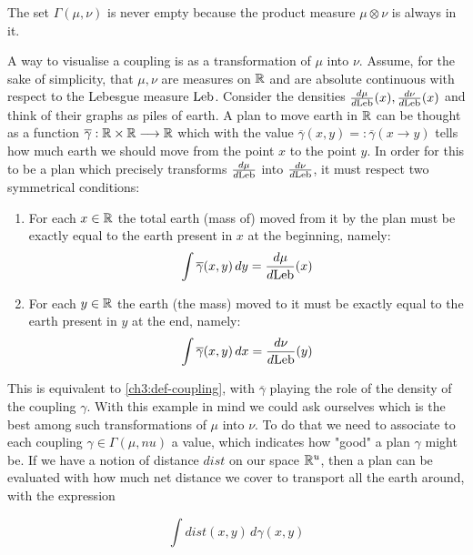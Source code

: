 \begin{remark}
	The set $\Gamma(\mu,\nu)$ is never empty because the product measure $\mu \otimes \nu$ is always in it.
\end{remark}

A way to visualise a coupling is as a transformation of $\mu$ into $\nu$.
Assume, for the sake of simplicity, that $\mu,\nu$ are measures on $\mathbb{R}$ and are absolute continuous with respect to the Lebesgue measure $\text{Leb}$.
Consider the densities $\frac{d\mu}{d\text{Leb}}(x), \frac{d\nu}{d\text{Leb}}(x)$ and think of their graphs as piles of earth.
A plan to move earth in $\mathbb{R}$ can be thought as a function $\overline{\gamma}: \mathbb{R} \times \mathbb{R} \longrightarrow \mathbb{R} $ which with the value $\overline{\gamma}(x,y)=: \overline{\gamma}(x\rightarrow y)$ tells how much earth we should move from the point $x$ to the point $y$.
In order for this to be a plan which precisely transforms $\frac{d\mu}{d\text{Leb}}$ into $\frac{d\nu}{d\text{Leb}}$, it must respect two symmetrical conditions:
\begin{enumerate}
	\item For each $x\in\mathbb{R}$ the total earth (mass of) moved from it by the plan must be exactly equal to the earth present in $x$ at the beginning, namely:
	\begin{equation}
		\int \overline{\gamma}(x,y) \,dy = \frac{d\mu}{d\text{Leb}}(x)
	\end{equation}
	\item For each $y\in\mathbb{R}$ the earth (the mass) moved to it must be exactly equal to the earth present in $y$ at the end, namely:
	\begin{equation}
		\int \overline{\gamma}(x,y) \,dx = \frac{d\nu}{d\text{Leb}}(y)
	\end{equation}
\end{enumerate}

This is equivalent to \ref{ch3:def-coupling}, with $\overline{\gamma}$ playing the role of the density of the coupling $\gamma$.
With this example in mind we could ask ourselves which is the best among such transformations of $\mu$ into $\nu$.
To do that we need to associate to each coupling $\gamma \in \Gamma(\mu,nu)$ a value, which indicates how "good" a plan $\gamma$ might be.
If we have a notion of distance $dist$ on our space $\mathbb{R}^u$, then a plan can be evaluated with how much net distance we cover to transport all the earth around, \ie with the expression

\begin{equation}
	\int dist(x,y) \,d\gamma(x,y)
\end{equation}

